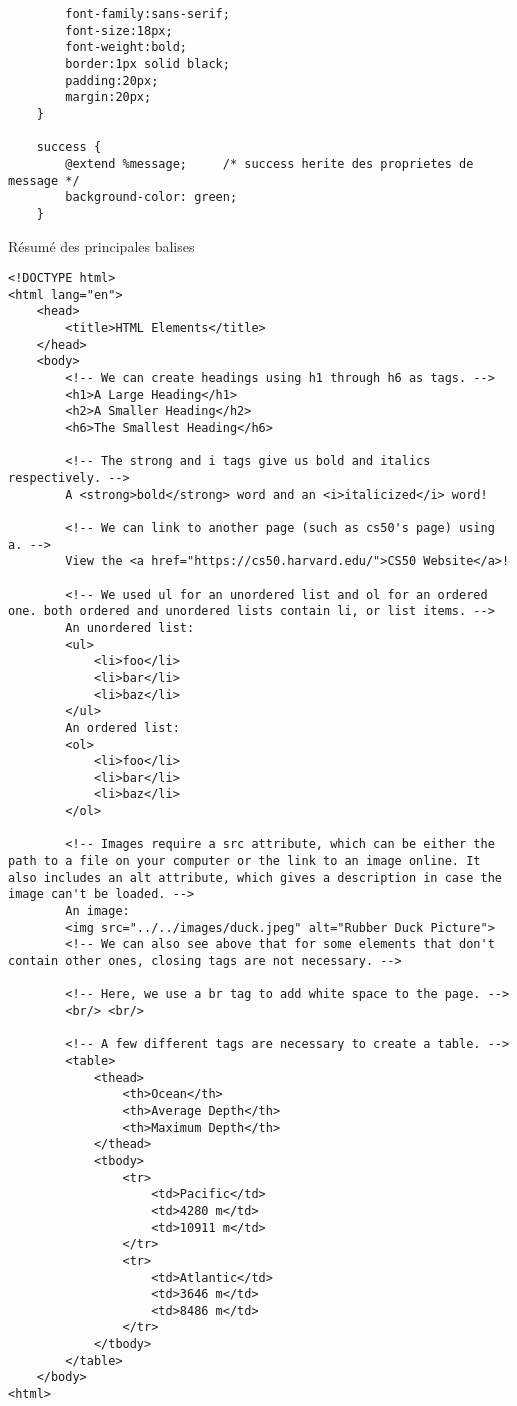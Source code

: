 \documentclass{report}
\begin{document}
\begin{ExampleDdHTML*}{}{}
  \begin{lstlisting}[style=CSSDraculaDark] 
    %message {
		font-family:sans-serif;
		font-size:18px;
		font-weight:bold;
		border:1px solid black;
		padding:20px;
		margin:20px;
	}

	success {
		@extend %message;	  /* success herite des proprietes de message */
		background-color: green;
	}\end{lstlisting}
\end{ExampleDdHTML*}



\begin{ExampleDdHTML*}{Résumé des principales balises}{}
\begin{lstlisting}[style=HTMLDraculaDark]
<!DOCTYPE html>
<html lang="en">
    <head>
        <title>HTML Elements</title>
    </head>
    <body>
        <!-- We can create headings using h1 through h6 as tags. -->
        <h1>A Large Heading</h1>
        <h2>A Smaller Heading</h2>
        <h6>The Smallest Heading</h6>

        <!-- The strong and i tags give us bold and italics respectively. -->
        A <strong>bold</strong> word and an <i>italicized</i> word!

        <!-- We can link to another page (such as cs50's page) using a. -->
        View the <a href="https://cs50.harvard.edu/">CS50 Website</a>!

        <!-- We used ul for an unordered list and ol for an ordered one. both ordered and unordered lists contain li, or list items. -->
        An unordered list:
        <ul>
            <li>foo</li>
            <li>bar</li>
            <li>baz</li>
        </ul>
        An ordered list:
        <ol>
            <li>foo</li>
            <li>bar</li>
            <li>baz</li>
        </ol>

        <!-- Images require a src attribute, which can be either the path to a file on your computer or the link to an image online. It also includes an alt attribute, which gives a description in case the image can't be loaded. -->
        An image:
        <img src="../../images/duck.jpeg" alt="Rubber Duck Picture">
        <!-- We can also see above that for some elements that don't contain other ones, closing tags are not necessary. -->

        <!-- Here, we use a br tag to add white space to the page. -->
        <br/> <br/>

        <!-- A few different tags are necessary to create a table. -->
        <table>
            <thead>
                <th>Ocean</th>
                <th>Average Depth</th>
                <th>Maximum Depth</th>
            </thead>
            <tbody>
                <tr>
                    <td>Pacific</td>
                    <td>4280 m</td>
                    <td>10911 m</td>
                </tr>
                <tr>
                    <td>Atlantic</td>
                    <td>3646 m</td>
                    <td>8486 m</td>
                </tr>
            </tbody>
        </table>
    </body>
<html>	
\end{lstlisting}
\end{ExampleDdHTML*}
\end{document}
